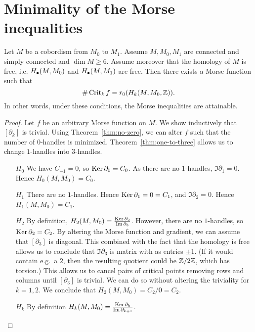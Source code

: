 \section{Minimality of the Morse inequalities}
\label{sec:minimality}
\begin{theorem}
    Let $M$ be a cobordism from $M_0$ to $M_1$.
    Assume $M, M_0, M_1$ are connected and simply connected and $\dim M \ge 6$.
    Assume moreover that the homology of $M$ is free, i.e.  $H_{\bullet}(M, M_0)$ and $H_{\bullet}(M, M_1)$ are free.
    Then there exists a Morse function such that
    \[
        \# \operatorname{Crit}_k f = r_0(H_k(M, M_0, \mathbb{Z}))
    .\] 
    In other words, under these conditions, the Morse inequalities are attainable.
    \label{thm:minimal-cob}
\end{theorem}
\begin{proof}
    Let $f$ be an arbitrary Morse function on $M$.
    We show inductively that $[\partial_k]$ is trivial.
    Using Theorem~\ref{thm:no-zero}, we can alter $f$ such that the number of $0$-handles is minimized.
    Theorem~\ref{thm:one-to-three} allows us to change $1$-handles into $3$-handles.
    \begin{enumerate}
        \item[$H_0$]
            We have $C_{-1} = 0$, so $\operatorname{Ker} \partial_0 = C_0$.
            As there are no $1$-handles, $\Im \partial_1 = 0$.
            Hence  $H_0(M, M_0) = C_0$.
        \item[$H_1$]
            There are no $1$-handles.
            Hence $\operatorname{Ker} \partial_1 = 0 = C_1$, and $\Im \partial_2 = 0$. Hence  $H_1(M, M_0) = C_1$.
        \item[$ H_2$]
            By definition, $H_2(M, M_0) = \frac{\operatorname{Ker} \partial_2}{\operatorname{Im} \partial_3}$.
            However, there are no $1$-handles,
            so $\operatorname{Ker} \partial_2 = C_2$.
            By altering the Morse function and gradient, we can assume that $[\partial_3]$ is diagonal.
            This combined with the fact that the homology is free allows us to conclude that $\Im \partial_3$ is matrix with as entries $\pm 1$.
            (If it would contain e.g.\ a $2$, then the resulting quotient could be  $\mathbb{Z} / 2 \mathbb{Z}$, which has torsion.)
            This allows us to cancel pairs of critical points removing rows and columns until $[\partial_3]$ is trivial.
            We can do so without altering the triviality for $k = 1,2$.
            We conclude that $H_2(M, M_0) = C_2 / 0 = C_2$.
        \item [$H_k$]
            By definition $H_k(M, M_0) = \frac{\operatorname{Ker} \partial_k}{\operatorname{Im} \partial_{k+1}}$.

\end{enumerate}
\end{proof}
